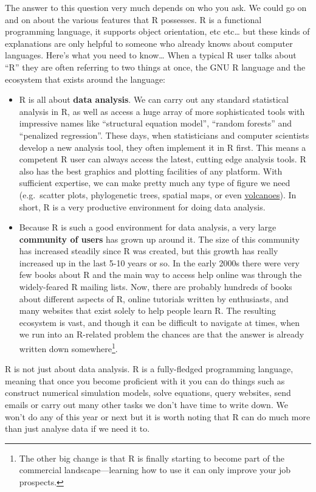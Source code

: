 \documentclass[
]{book}
\begin{document}
The answer to this question very much depends on who you ask. We could go on and on about the various features that R possesses. R is a functional programming language, it supports object orientation, etc etc\ldots{} but these kinds of explanations are only helpful to someone who already knows about computer languages. Here's what you need to know\ldots{} When a typical R user talks about ``R'' they are often referring to two things at once, the GNU R language and the ecosystem that exists around the language:

\begin{itemize}
\item
  R is all about \textbf{data analysis}. We can carry out any standard statistical analysis in R, as well as access a huge array of more sophisticated tools with impressive names like ``structural equation model'', ``random forests'' and ``penalized regression''. These days, when statisticians and computer scientists develop a new analysis tool, they often implement it in R first. This means a competent R user can always access the latest, cutting edge analysis tools. R also has the best graphics and plotting facilities of any platform. With sufficient expertise, we can make pretty much any type of figure we need (e.g.~scatter plots, phylogenetic trees, spatial maps, or even \href{http://www.r-project.org/screenshots/volcano-image.jpg}{volcanoes}). In short, R is a very productive environment for doing data analysis.
\item
  Because R is such a good environment for data analysis, a very large \textbf{community of users} has grown up around it. The size of this community has increased steadily since R was created, but this growth has really increased up in the last 5-10 years or so. In the early 2000s there were very few books about R and the main way to access help online was through the widely-feared R mailing lists. Now, there are probably hundreds of books about different aspects of R, online tutorials written by enthusiasts, and many websites that exist solely to help people learn R. The resulting ecosystem is vast, and though it can be difficult to navigate at times, when we run into an R-related problem the chances are that the answer is already written down somewhere\footnote{The other big change is that R is finally starting to become part of the commercial landscape---learning how to use it can only improve your job prospects.}.
\end{itemize}

R is not just about data analysis. R is a fully-fledged programming language, meaning that once you become proficient with it you can do things such as construct numerical simulation models, solve equations, query websites, send emails or carry out many other tasks we don't have time to write down. We won't do any of this year or next but it is worth noting that R can do much more than just analyse data if we need it to.
\end{document}
